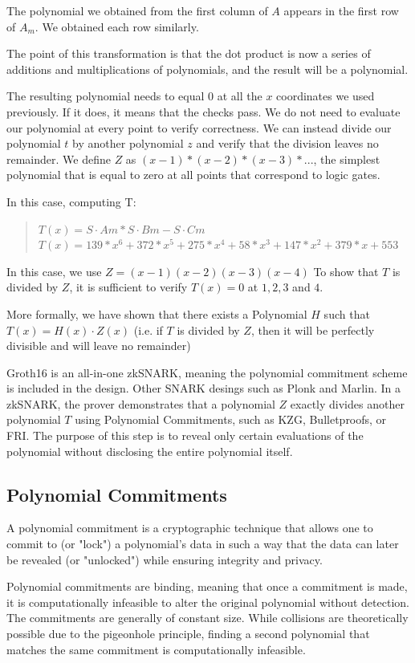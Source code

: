 The polynomial we obtained from the first column of $A$ appears in the first row of $A_m$. We obtained each row similarly.

The point of this transformation is that the dot product is now a series of additions and multiplications of polynomials, and the result will be a polynomial.

The resulting polynomial needs to equal $0$ at all the $x$ coordinates we used previously.
If it does, it means that the checks pass.
We do not need to evaluate our polynomial at every point to verify correctness. 
We can instead divide our polynomial $t$ by another polynomial $z$ and verify that the division leaves no remainder.
We define $Z$ as $(x - 1) * (x - 2) * (x - 3) * ...$, the simplest polynomial that is equal to zero at all points that correspond to logic gates. 

In this case, computing T:
\begin{quote}
$T(x) = S \cdot Am * S \cdot Bm - S \cdot Cm  $
$T(x) = 139*x^6 + 372*x^5 + 275*x^4 + 58*x^3 + 147*x^2 + 379*x + 553$
\end{quote}

In this case, we use $Z = (x-1)(x-2)(x-3)(x-4)$
To show that $T$ is divided by $Z$, it is sufficient to verify $T(x) = 0$ at $1,2,3$ and $4$.

More formally, we have shown that there exists a Polynomial $H$ such that $T(x)=H(x) \cdot Z(x)$
(i.e. if $T$ is divided by $Z$, then it will be perfectly divisible and will leave no remainder)


Groth16 is an all-in-one zkSNARK, meaning the polynomial commitment scheme is included in the design. Other SNARK desings such as Plonk and Marlin.
In a zkSNARK, the prover demonstrates that a polynomial $Z$ exactly divides another polynomial
$T$ using Polynomial Commitments, such as KZG, Bulletproofs, or FRI. 
The purpose of this step is to reveal only certain evaluations of the polynomial without disclosing the entire polynomial itself.\cite{VB16}


\subsection{Polynomial Commitments}
\label{subsec:pc}
A polynomial commitment is a cryptographic technique that allows one to commit to (or "lock") a polynomial's data 
in such a way that the data can later be revealed (or "unlocked") while ensuring integrity and privacy.

Polynomial commitments are binding, meaning that once a commitment is made, it is computationally infeasible to alter the original polynomial without detection. 
The commitments are generally of constant size. While collisions are theoretically possible due to the pigeonhole principle, finding a second polynomial that matches the same commitment is computationally infeasible.

